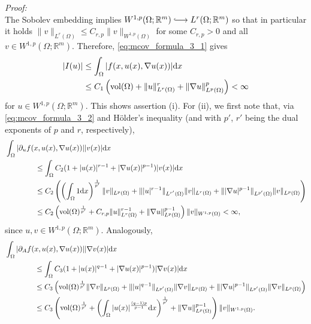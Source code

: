 \textit{Proof:}\\
The Sobolev embedding implies $W^{1,p}(\Omega;\mathbb{R}^m)\longhookrightarrow L^r(\Omega;\mathbb{R}^m)$ so that in particular it holds $\lVert v\rVert_{L^r(\Omega)}\leq C_{r,p}\lVert v\rVert_{W^{1,p}(\Omega)}$ for some $C_{r,p}>0$ and all $v\in W^{1,p}(\Omega;\mathbb{R}^m)$. Therefore, \eqref{eq:mcov_formula_3_1} gives
\begin{align*}
	\lvert I(u)\rvert&\leq\int_\Omega{\lvert f(x,u(x),\nabla u(x))\rvert\mathrm{d}x}\\
	&\leq C_1\left(\operatorname{vol}\mathopen{}\left(\Omega\right)\mathclose{}+\lVert u\rVert_{L^r(\Omega)}^r+\lVert\nabla u\rVert_{L^p(\Omega)}^p\right)<\infty
\end{align*}
for $u\in W^{1,p}(\Omega;\mathbb{R}^m)$. This shows assertion (i). For (ii), we first note that, via \eqref{eq:mcov_formula_3_2} and H\"older's inequality (and with $p'$, $r'$ being the dual exponents of $p$ and $r$, respectively),
\begin{align*}
	&\int_\Omega{\lvert\partial_uf(x,u(x),\nabla u(x))\rvert\lvert v(x)\rvert\mathrm{d}x}\\
	&\qquad\qquad\leq\int_\Omega{C_2(1+\lvert u(x)\rvert^{r-1}+\lvert\nabla u(x)\rvert^{p-1})\lvert v(x)\rvert\mathrm{d}x}\\
	&\qquad\qquad\leq C_2\left(\left(\int_\Omega{1\mathrm{d}x}\right)^{\frac{1}{p'}}\lVert v\rVert_{L^p(\Omega)}+\lVert\lvert u\rvert^{r-1}\rVert_{L^{r'}(\Omega)}\lVert v\rVert_{L^r(\Omega)}+\lVert\lvert\nabla u\rvert^{p-1}\rVert_{L^{p'}(\Omega)}\lVert v\rVert_{L^p(\Omega)}\right)\\
	&\qquad\qquad\leq C_2\left(\operatorname{vol}\mathopen{}\left(\Omega\right)\mathclose{}^{\frac{1}{p'}}+C_{r,p}\lVert u\rVert_{L^r(\Omega)}^{r-1}+\lVert\nabla u\rVert_{L^p(\Omega)}^{p-1}\right)\lVert v\rVert_{W^{1,p}(\Omega)}<\infty,
\end{align*}
since $u,v\in W^{1,p}(\Omega;\mathbb{R}^m)$. Analogously,
\begin{align*}
	&\int_\Omega{\lvert\partial_Af(x,u(x),\nabla u(x))\rvert\lvert\nabla v(x)\rvert\mathrm{d}x}\\
	&\qquad\qquad\leq\int_\Omega{C_3(1+\lvert u(x)\rvert^{q-1}+\lvert\nabla u(x)\rvert^{p-1})\lvert\nabla v(x)\rvert\mathrm{d}x}\\
	&\qquad\qquad\leq C_3\left(\operatorname{vol}\mathopen{}\left(\Omega\right)\mathclose{}^{\frac{1}{p'}}\lVert\nabla v\rVert_{L^p(\Omega)}+\lVert\lvert u\rvert^{q-1}\rVert_{L^{p'}(\Omega)}\lVert\nabla v\rVert_{L^p(\Omega)}+\lVert\lvert\nabla u\rvert^{p-1}\rVert_{L^{p'}(\Omega)}\lVert\nabla v\rVert_{L^p(\Omega)}\right)\\
	&\qquad\qquad\leq C_3\left(\operatorname{vol}\mathopen{}\left(\Omega\right)\mathclose{}^{\frac{1}{p'}}+\left(\int_\Omega{\lvert u(x)\rvert^{\frac{(q-1)p}{p-1}}\mathrm{d}x}\right)^{\frac{1}{p'}}+\lVert\nabla u\rVert_{L^p(\Omega)}^{p-1}\right)\lVert v\rVert_{W^{1,p}(\Omega)}.
\end{align*}
